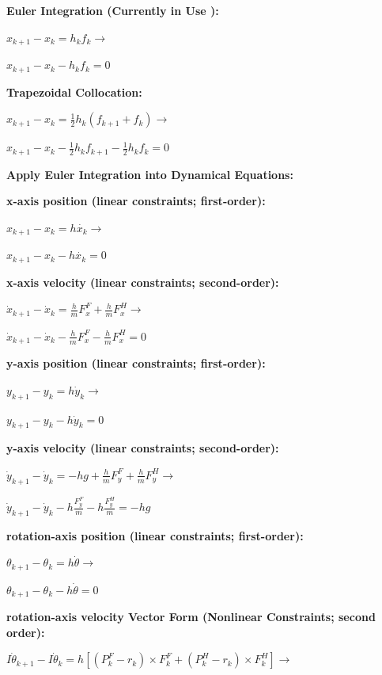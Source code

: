\documentclass[a4paper,10pt]{article}
\begin{document}
\textbf{Euler Integration (Currently in Use ):}

$x_{k+1}-x_k =h_kf_k \rightarrow$

$x_{k+1}-x_k-h_kf_k = 0$

\vspace{2mm}

\textbf{Trapezoidal Collocation:}

$x_{k+1}-x_k = \frac{1}{2}h_k(f_{k+1}+f_k) \rightarrow$

$x_{k+1}-x_k-\frac{1}{2}h_kf_{k+1}-\frac{1}{2}h_kf_k = 0$

\vspace{10mm}

\textbf{Apply Euler Integration into Dynamical Equations:}

\textbf{x-axis position (linear constraints; first-order):}

$x_{k+1} - x_k = h\dot{x_k} \rightarrow$

$x_{k+1} - x_k - h\dot{x_k} = 0$

\textbf{x-axis velocity (linear constraints; second-order):}

$\dot{x}_{k+1} - \dot{x}_k = \frac{h}{m}F^F_x + \frac{h}{m}F^H_x \rightarrow$

$\dot{x}_{k+1} - \dot{x}_k - \frac{h}{m}F^F_x - \frac{h}{m}F^H_x = 0$

\textbf{y-axis position (linear constraints; first-order):}

$y_{k+1} - y_k = h\dot{y}_k \rightarrow$

$y_{k+1} - y_k - h\dot{y}_k = 0$

\textbf{y-axis velocity (linear constraints; second-order):}

$\dot{y}_{k+1} - \dot{y}_k = -hg + \frac{h}{m}F^F_y + \frac{h}{m}F^H_y \rightarrow$

$\dot{y}_{k+1} - \dot{y}_k - h\frac{F^F_y}{m} - h\frac{F^H_y}{m} = -hg$

\textbf{rotation-axis position (linear constraints; first-order):}

$\theta_{k+1} - \theta_k = h\dot{\theta} \rightarrow$

$\theta_{k+1} - \theta_k - h\dot{\theta} = 0$

\vspace{3mm}

\textbf{rotation-axis velocity Vector Form  (Nonlinear Constraints; second order):}

$I\dot{\theta}_{k+1} - I\dot{\theta}_k = h[(P^F_k - r_k) \times F^F_k + (P^H_k - r_k) \times F^H_k] \rightarrow$
\end{document}
